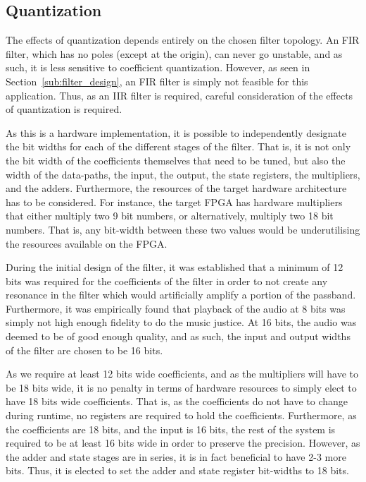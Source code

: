 \documentclass[]{article}
\begin{document}
\subsection{Quantization} %
\label{sub:quantization}

The effects of quantization depends entirely on the chosen filter topology. An FIR filter, which has no poles (except at the origin), can never go unstable, and as such, it is less sensitive to coefficient quantization. However, as seen in Section~\ref{sub:filter_design}, an FIR filter is simply not feasible for this application. Thus, as an IIR filter is required, careful consideration of the effects of quantization is required.

As this is a hardware implementation, it is possible to independently designate the bit widths for each of the different stages of the filter. That is, it is not only the bit width of the coefficients themselves that need to be tuned, but also the width of the data-paths, the input, the output, the state registers, the multipliers, and the adders. Furthermore, the resources of the target hardware architecture has to be considered.
For instance, the target FPGA has hardware multipliers that either multiply two 9 bit numbers, or alternatively, multiply two 18 bit numbers. That is, any bit-width between these two values would be underutilising the resources available on the FPGA.

During the initial design of the filter, it was established that a minimum of 12 bits was required for the coefficients of the filter in order to not create any resonance in the filter which would artificially amplify a portion of the passband.
Furthermore, it was empirically found that playback of the audio at 8 bits was simply not high enough fidelity to do the music justice. At 16 bits, the audio was deemed to be of good enough quality, and as such, the input and output widths of the filter are chosen to be 16 bits.

As we require at least 12 bits wide coefficients, and as the multipliers will have to be 18 bits wide, it is no penalty in terms of hardware resources to simply elect to have 18 bits wide coefficients. That is, as the coefficients do not have to change during runtime, no registers are required to hold the coefficients.
Furthermore, as the coefficients are 18 bits, and the input is 16 bits, the rest of the system is required to be at least 16 bits wide in order to preserve the precision. However, as the adder and state stages are in series, it is in fact beneficial to have 2-3 more bits. Thus, it is elected to set the adder and state register bit-widths to 18 bits.
\end{document}

